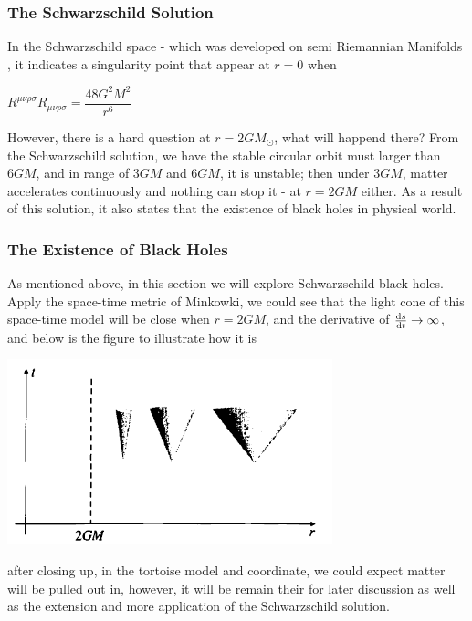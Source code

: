\documentclass[11pt,a4paper]{article}
\begin{document}
	\subsubsection{The Schwarzschild Solution}
	In the Schwarzschild space - which was developed on semi Riemannian Manifolds , it indicates a singularity point that appear at $r = 0$ when
	\begin{center}
		$R^{\mu \nu \rho \sigma} R_{\mu \nu \rho \sigma} = \dfrac{48 G^2 M^2}{r^6}$
	\end{center}
	However, there is a hard question at $r = 2GM_{\odot}$, what will happend there? 
	From the Schwarzschild solution, we have the stable circular orbit must larger than $6GM$,  and in range of $3GM$ and $6GM$, it is unstable; then under $3GM$, matter accelerates continuously and nothing can stop it - at $r = 2GM$ either. As a result of this solution, it also states that the existence of black holes in physical world. 
	\subsubsection{The Existence of Black Holes}
	As mentioned above, in this section we will explore Schwarzschild black holes. Apply the space-time metric of Minkowki, we could see that the light cone of this space-time model will be close when $r = 2GM$, and the derivative of  $\dv{s}{t} \rightarrow \infty$, and below is the figure to illustrate how it is
	\begin{center}
		\includegraphics[scale=0.5]{./con_close.png}
	\end{center}
	after closing up, in the tortoise model and coordinate, we could expect matter will be pulled out in, however, it will be remain their for later discussion as well as the extension and more application of the Schwarzschild solution.
\end{document}
